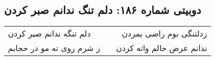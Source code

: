 \begin{center}
\section*{دوبیتی شماره ۱۸۶: دلم تنگ ندانم صبر کردن}
\label{sec:186}
\begin{longtable}{l p{0.5cm} r}
دلم تنگه ندانم صبر کردن
&&
زدلتنگی بوم راضی بمردن
\\
ز شرم روی ته مو در حجابم
&&
ندانم عرض حالم واته کردن
\\
\end{longtable}
\end{center}
